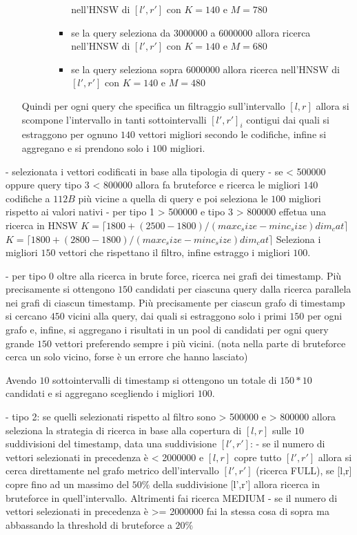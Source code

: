 \begin{itemize}
\begin{itemize}
\begin{itemize}
\begin{itemize}
                nell'HNSW di $[l',r']$ con $K=140$ e $M=780$
                \item se la query seleziona da $3000000$ a $6000000$ allora ricerca 
                nell'HNSW di $[l',r']$ con $K=140$ e $M=680$
                \item se la query seleziona sopra $6000000$ allora ricerca 
                nell'HNSW di $[l',r']$ con $K=140$ e $M=480$
            \end{itemize}
        \end{itemize}
    \end{itemize} 
    Quindi per ogni query che specifica un filtraggio sull'intervallo $[l,r]$ allora 
    si scompone l'intervallo in tanti sottointervalli $[l',r']_i$ contigui dai quali 
    si estraggono per ognuno $140$ vettori migliori secondo le codifiche, infine 
    si aggregano e si prendono solo i $100$ migliori. 
\end{itemize}




- selezionata i vettori codificati in base alla tipologia di query
- se < 500000 oppure query tipo 3 < 800000 allora fa bruteforce e ricerca le migliori $140$ codifiche a $112 B$
più vicine a quella di query e poi seleziona le $100$ migliori rispetto ai valori 
nativi
- per tipo 1 > 500000 e tipo 3 > 800000  effetua una ricerca in HNSW $K= \lceil1800+(2500-1800)/(maxc_size - minc_size)dim_cat\rceil$
 $K= \lceil1800+(2800-1800)/(maxc_size - minc_size)dim_cat\rceil$
 Seleziona i migliori $150$ vettori che rispettano il filtro, infine estraggo i 
 migliori $100$.

- per tipo 0 oltre alla ricerca in brute force, ricerca nei grafi dei timestamp.
 Più precisamente si ottengono $150$ candidati per ciascuna query dalla ricerca 
 parallela nei grafi di ciascun timestamp. Più precisamente per ciascun grafo di 
 timestamp si cercano $450$ vicini alla query, dai quali si estraggono solo i primi 
 $150$ per ogni grafo e, infine, si aggregano i risultati in un pool 
 di candidati per ogni query grande $150$ vettori preferendo sempre i più vicini.
 (nota nella parte di bruteforce cerca un solo vicino, forse è un errore che hanno 
 lasciato)

 Avendo $10$ sottointervalli di timestamp si ottengono un totale di $150*10$ candidati 
 e si aggregano scegliendo i migliori $100$.
 
- tipo 2: se quelli selezionati rispetto al filtro sono > 500000 e > 800000 allora 
 seleziona la strategia di ricerca in base alla copertura di $[l,r]$ sulle $10$ 
 suddivisioni del timestamp, data una suddivisione $[l',r']$:
    - se il numero di vettori selezionati in precedenza è < 2000000 e $[l,r]$ copre 
    tutto $[l',r']$ allora si cerca direttamente nel grafo metrico dell'intervallo $[l',r']$ (ricerca FULL),
    se [l,r] copre fino ad un massimo del $50\%$ della suddivisione [l',r'] allora 
    ricerca in bruteforce in quell'intervallo. Altrimenti fai ricerca MEDIUM
    - se il numero di vettori selezionati in precedenza è >= 2000000 fai la stessa 
    cosa di sopra ma abbassando la threshold di bruteforce a  $20\%$

